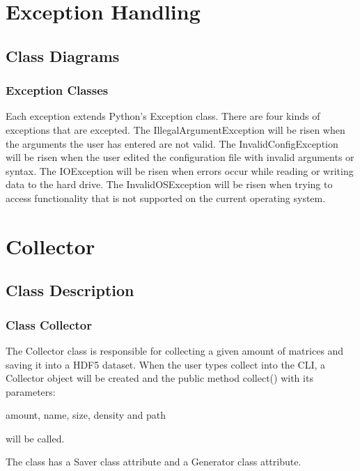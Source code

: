 \documentclass[parskip=full]{scrartcl}
\begin{document}


\section{Exception Handling}

\subsection{Class Diagrams}

\subsubsection{Exception Classes}

Each exception extends Python's Exception class.
There are four kinds of exceptions that are excepted.
The IllegalArgumentException will be risen when the arguments the user has entered are not valid.
The InvalidConfigException will be risen when the user edited the configuration file with invalid arguments or syntax.
The IOException will be risen when errors occur while reading or writing data to the hard drive.
The InvalidOSException will be risen when trying to access functionality that is not supported on the current operating system.



\section{Collector}

\subsection{Class Description}

\subsubsection{Class Collector}
The Collector class is responsible for collecting a given amount of matrices and saving it into a HDF5 dataset.
When the user types collect into the CLI, a Collector object will be created and the public method collect() with its parameters:

amount, name, size, density and path

will be called. 

The class has a Saver class attribute and a Generator class attribute.
\end{document}
